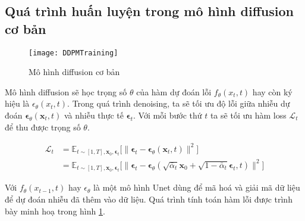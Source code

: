 	
	\subsection{Quá trình huấn luyện trong mô hình diffusion cơ bản}
	
	\begin{figure}[H]
		\centering
		\texttt{[image: DDPMTraining]}
		\caption{Mô hình diffusion cơ bản}
		\label{fig:basic_diffusion}
	\end{figure}
	
	Mô hình diffusion sẽ học trọng số $\theta$ của hàm dự đoán lỗi $f_{\theta} (x_t, t)$ hay còn ký hiệu là  $\epsilon_{\theta} (x_t, t)$. Trong quá trình denoising, ta sẽ tối ưu độ lỗi giữa nhiễu dự đoán $\boldsymbol{\epsilon}_\theta(\mathbf{x}_t, t)$ và nhiễu thực tế $\boldsymbol{\epsilon}_t$. Với mỗi bước thứ $t$ ta sẽ tối ưu hàm loss $\mathcal{L}_{t}$ để thu được trọng số $\theta$.
	
	\begin{equation}
		\label{eq:diffusion_loss}
		\begin{aligned}
			\mathcal{L}_t
			&= \mathbb{E}_{t \sim [1, T], \mathbf{x}_0, \boldsymbol{\epsilon}_t} \Big[\|\boldsymbol{\epsilon}_t - \boldsymbol{\epsilon}_\theta(\mathbf{x}_t, t)\|^2 \Big] \\
			&= \mathbb{E}_{t \sim [1, T], \mathbf{x}_0, \boldsymbol{\epsilon}_t} \Big[\|\boldsymbol{\epsilon}_t - \boldsymbol{\epsilon}_\theta(\sqrt{\bar{\alpha}_t}\mathbf{x}_0 + \sqrt{1 - \bar{\alpha}_t}\boldsymbol{\epsilon}_t, t)\|^2 \Big]
		\end{aligned}
	\end{equation}
	
	
Với $f_{\theta}(x_{t-1}, t)$ hay $\epsilon_\theta$ là một mô hình Unet dùng để mã hoá và giải mã dữ liệu để dự đoán nhiễu đã thêm vào dữ liệu. Quá trình tính toán hàm lỗi được trình bày minh hoạ trong hình \ref{fig:basic_diffusion}.


